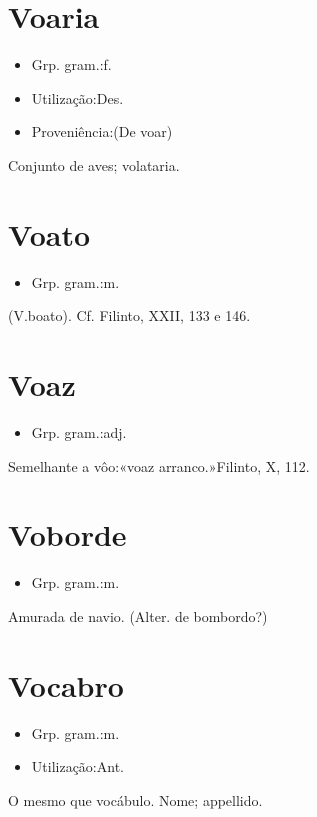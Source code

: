 \documentclass{article}
\begin{document}
\section{Voaria}
\begin{itemize}
\item {Grp. gram.:f.}
\end{itemize}
\begin{itemize}
\item {Utilização:Des.}
\end{itemize}
\begin{itemize}
\item {Proveniência:(De \textunderscore voar\textunderscore )}
\end{itemize}
Conjunto de aves; volataria.
\section{Voato}
\begin{itemize}
\item {Grp. gram.:m.}
\end{itemize}
(V.boato). Cf. Filinto, XXII, 133 e 146.
\section{Voaz}
\begin{itemize}
\item {Grp. gram.:adj.}
\end{itemize}
Semelhante a vôo:«\textunderscore voaz arranco.\textunderscore »Filinto, X, 112.
\section{Voborde}
\begin{itemize}
\item {Grp. gram.:m.}
\end{itemize}
Amurada de navio.
(Alter. de \textunderscore bombordo\textunderscore ?)
\section{Vocabro}
\begin{itemize}
\item {Grp. gram.:m.}
\end{itemize}
\begin{itemize}
\item {Utilização:Ant.}
\end{itemize}
O mesmo que \textunderscore vocábulo\textunderscore .
Nome; appellido.
\end{document}
